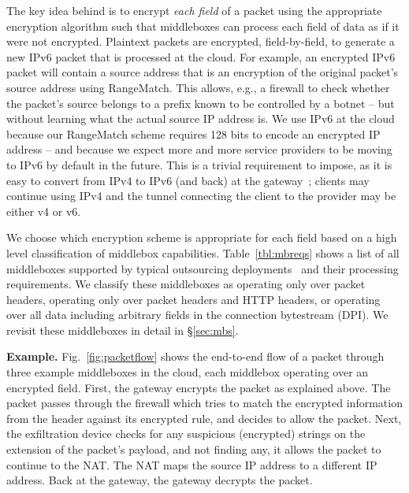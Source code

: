 The key idea behind \sys is to encrypt {\it each field} of a packet using the appropriate encryption algorithm such that middleboxes can process each field of data as if it were not encrypted. 
Plaintext packets are encrypted, field-by-field, to generate a new IPv6 packet that is processed at the cloud.
For example, an encrypted IPv6 packet will contain a source address that is an encryption of the original packet's source address using RangeMatch. This allows, e.g., a firewall to check whether the packet's source belongs to a prefix known to be controlled by a botnet -- but without learning what the actual source IP address is.
We use IPv6 at the cloud because our RangeMatch scheme requires 128 bits to encode an encrypted IP address -- and because we expect more and more service providers to be moving to IPv6 by default in the future.
This is a trivial requirement to impose, as it is easy to convert from IPv4 to IPv6 (and back) at the gateway~\cite{6to4,4to6}; clients may continue using IPv4 and the tunnel connecting the client to the provider may be either v4 or v6.

We choose which encryption scheme is appropriate for each field based on a high level classification of middlebox capabilities.
Table~\ref{tbl:mbreqs} shows a list of all middleboxes supported by typical outsourcing deployments~\cite{aplomb} and their processing requirements.
We classify these middleboxes as operating only over packet headers, operating only over packet headers and HTTP headers, or operating over all data including arbitrary fields in the connection bytestream (DPI).
We revisit these middleboxes in detail in \S\ref{sec:mbs}.


{\bf Example.} Fig.~\ref{fig:packetflow} shows the end-to-end flow of a packet through three example middleboxes in the cloud, each middlebox operating over an encrypted field.  
First,  the gateway encrypts the packet as explained above. The packet passes through the firewall which tries to match the encrypted information from the header against its encrypted rule, and decides to allow the packet. Next, the exfiltration device checks for any suspicious (encrypted) strings on the extension of the packet's payload, and not finding any, it allows the packet  to continue to the NAT. The NAT maps the source IP address to a different IP address. Back at the gateway, the gateway decrypts the packet. 



